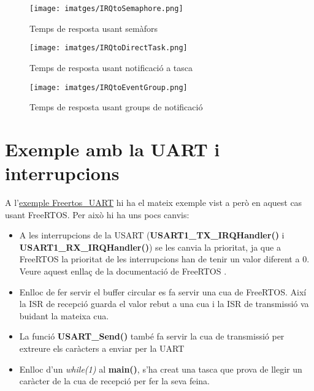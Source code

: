 \begin{figure}
 \centering
 \texttt{[image: imatges/IRQtoSemaphore.png]}
 \caption{Temps de resposta usant semàfors}
 \label{fig:IRQtoTaskTime_Semaphhore}
\end{figure}

\begin{figure}
 \centering
 \texttt{[image: imatges/IRQtoDirectTask.png]}
 \caption{Temps de resposta usant notificació a tasca}
 \label{fig:IRQtoTaskTime_Direct}
\end{figure}

\begin{figure}
 \centering
 \texttt{[image: imatges/IRQtoEventGroup.png]}
 \caption{Temps de resposta usant groups de notificació}
 \label{fig:IRQtoTaskTime_Group}
\end{figure}

\chapter{Exemple amb la UART i interrupcions}
A l’\href{https://github.com/mariusmm/cursembedded/tree/master/Simplicity/FreeRTOS_UART}{exemple Freertos\_UART} hi ha el mateix exemple vist a  però en aquest cas usant FreeRTOS. Per això hi ha uns pocs canvis:
\begin{itemize}
 \item A les interrupcions de la USART ({\bf USART1\_TX\_IRQHandler()} i {\bf USART1\_RX\_IRQHandler()}) se les canvia la prioritat, ja que a FreeRTOS la prioritat de les interrupcions han de tenir un valor diferent a 0. Veure aquest enllaç de la documentació de FreeRTOS \cite{FreeRTOSIRQ}.
 \item Enlloc de fer servir el \gls{buffer circular} es fa servir una cua de FreeRTOS. Així la \gls{ISR} de recepció guarda el valor rebut a una cua i la \gls{ISR} de transmissió va buidant la mateixa cua.
 \item La funció {\bf USART\_Send()} també fa servir la cua de transmissió per extreure els caràcters a enviar per la UART
 \item Enlloc d’un {\em while(1)} al {\bf main()}, s'ha creat una tasca que prova de llegir un caràcter de la cua de recepció per fer la seva feina.
\end{itemize}

